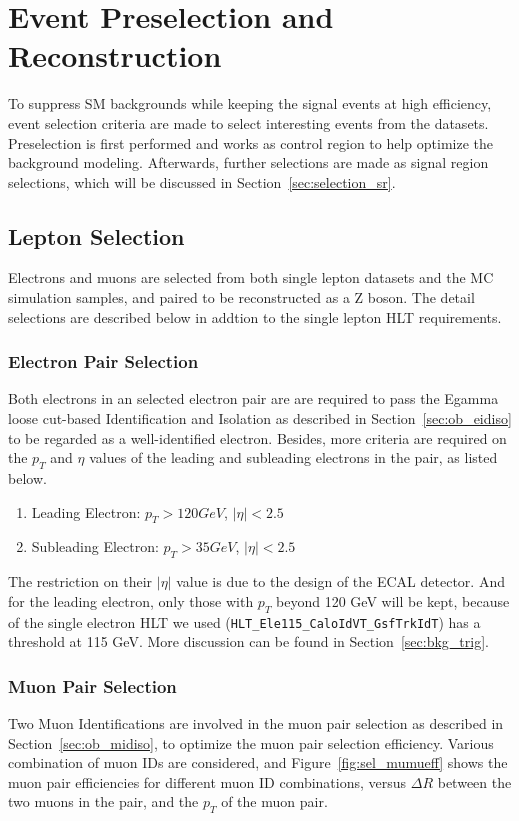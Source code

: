 \section{Event Preselection and Reconstruction}
To suppress SM backgrounds while keeping the signal events at high efficiency, event selection criteria are made to select interesting events from the datasets. Preselection is first performed and works as control region to help optimize the background modeling. Afterwards, further selections are made as signal region selections, which will be discussed in Section~\ref{sec:selection_sr}.

\subsection{Lepton Selection}
Electrons and muons are selected from both single lepton datasets and the MC simulation samples, and paired to be reconstructed as a Z boson. The detail selections are described below in addtion to the single lepton HLT requirements.
\subsubsection{Electron Pair Selection}
Both electrons in an selected electron pair are are required to pass the Egamma loose cut-based Identification and Isolation as described in Section~\ref{sec:ob_eidiso} to be regarded as a well-identified electron. Besides, more criteria are required on the $p_T$ and $\eta$ values of the leading and subleading electrons in the pair, as listed below.
\begin{enumerate}
\item Leading Electron: $p_T >120 GeV$, $|\eta|<2.5$
\item Subleading Electron: $p_T >35 GeV$, $|\eta|<2.5$
\end{enumerate}

The restriction on their $|\eta|$ value is due to the design of the ECAL detector. And for the leading electron, only those with $p_T$ beyond 120 GeV will be kept, because of the single electron HLT we used (\texttt{HLT\_Ele115\_CaloIdVT\_GsfTrkIdT}) has a threshold at 115 GeV. More discussion can be found in Section~\ref{sec:bkg_trig}.

\subsubsection{Muon Pair Selection}\label{sec:muonselection}
Two Muon Identifications are involved in the muon pair selection as described in Section~\ref{sec:ob_midiso}, to optimize the muon pair selection efficiency. Various combination of muon IDs are considered, and Figure~\ref{fig:sel_mumueff} shows the muon pair efficiencies for different muon ID combinations, versus $\Delta R$ between the two muons in the pair, and the $p_T$ of the muon pair.

